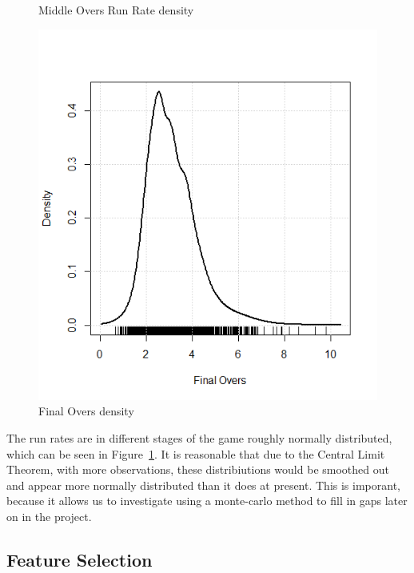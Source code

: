 \begin{figure}
      \caption{Middle Overs Run Rate density}
    \endminipage\hfill
      \includegraphics[width=\linewidth]{figures/finaloversdens.png}
      \caption{Final Overs density}
    \endminipage
    \label{rrDensitiesPlot}
\end{figure}

The run rates are  in different stages of the game roughly normally distributed, which can be seen in Figure~\ref{rrDensitiesPlot}. It is reasonable that due to the Central Limit Theorem, with more observations, these distribiutions would be smoothed out and 
appear more normally distributed than it does at present. This is imporant, because it allows us to investigate using a monte-carlo method to fill in gaps 
later on in the project.

\subsection{Feature Selection}
\label{lassoSec}

